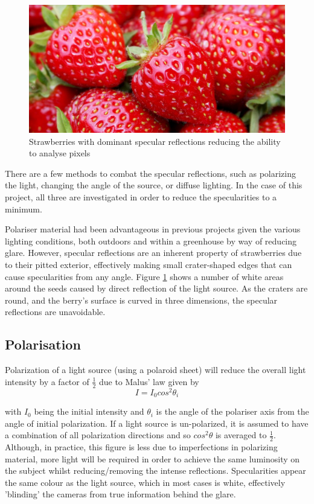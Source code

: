 \documentclass[fleqn,twoside,12pt]{report}
\begin{document}
\begin{figure}[h]
	\centering
	\includegraphics[width=.6\linewidth]{strawberry_glare.jpg}
	\caption{Strawberries with dominant specular reflections reducing the ability to analyse pixels}
	\label{fig:strawberry_glare}
\end{figure}%

There are a few methods to combat the specular reflections, such as polarizing the light, changing the angle of the source, or diffuse lighting. In the case of this project, all three are investigated in order to reduce the specularities to a minimum. 

Polariser material had been advantageous in previous projects given the various lighting conditions, both outdoors and within a greenhouse by way of reducing glare. However, specular reflections are an inherent property of strawberries due to their pitted exterior, effectively making small crater-shaped edges that can cause specularities from any angle. Figure \ref{fig:strawberry_glare} shows a number of white areas around the seeds caused by direct reflection of the light source. As the craters are round, and the berry's surface is curved in three dimensions, the specular reflections are unavoidable.


\subsection{Polarisation}


Polarization of a light source (using a polaroid sheet) will reduce the overall light intensity by a factor of $\frac{1}{2}$ due to Malus' law given by
\begin{equation}
I = I_{0} cos^{2}\theta_{i}
\end{equation}

with $I_{0}$ being the initial intensity and $\theta_{i}$ is the angle of the polariser axis from the angle of initial polarization. If a light source is un-polarized, it is assumed to have a combination of all polarization directions and so $cos^{2}\theta$ is averaged to $\frac{1}{2}$. Although, in practice, this figure is less due to imperfections in polarizing material, more light will be required in order to achieve the same luminosity on the subject \cite{rox, sommer} whilst reducing/removing the intense reflections. Specularities appear the same colour as the light source, which in most cases is white, effectively 'blinding' the cameras from true information behind the glare.  
\end{document}
